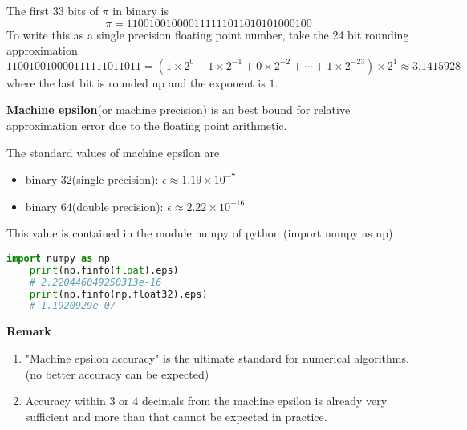 \documentclass[main.tex]{subfiles}
\begin{document}
\begin{example}
    The first $33$ bits of $\pi$ in binary is
    \begin{equation}
        \pi = 110010010000111111011010101000100
    \end{equation}
    To write this as a single precision floating point number, take the 24 bit rounding approximation 
    \begin{equation}
        110010010000111111011011 = (1\times 2^0 + 1\times 2^{-1} + 0\times 2^{-2} + \cdots + 1\times 2^{-23})\times 2^1 \approx 3.1415928
    \end{equation}
    where the last bit is rounded up and the exponent is $1$.  
\end{example}
\par \textbf{Machine epsilon}(or machine precision) is an best bound for relative approximation error due to the floating point arithmetic. 
\par The standard values of machine epsilon are
\begin{itemize}
    \item binary 32(single precision): $\epsilon \approx 1.19 \times 10^{-7}$
    \item binary 64(double precision): $\epsilon \approx 2.22 \times 10^{-16}$
\end{itemize}
\par This value is contained in the module numpy of python (import numpy as np) 
\begin{lstlisting}[language = Python]
    import numpy as np
    print(np.finfo(float).eps)
    # 2.220446049250313e-16
    print(np.finfo(np.float32).eps)
    # 1.1920929e-07
\end{lstlisting}
\par \noindent \textbf{Remark} 
\begin{enumerate}
    \item "Machine epsilon accuracy" is the ultimate standard for numerical algorithms. (no better accuracy can be expected)
    \item Accuracy within $3$ or 4 decimals from the machine epsilon is already very sufficient and more than that cannot be expected in practice. 
\end{enumerate}
\end{document}
